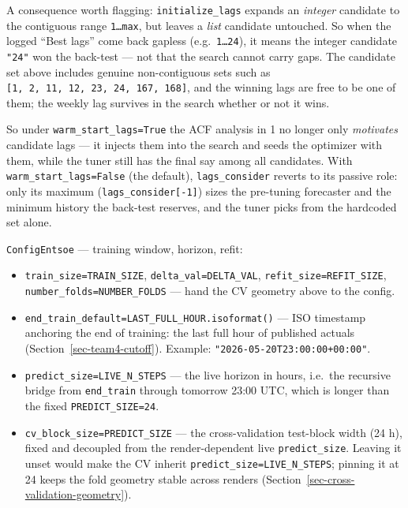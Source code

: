 \documentclass[
  english,
  letterpaper,
]{scrbook}
\providecommand{\tightlist}{%
  \setlength{\itemsep}{0pt}\setlength{\parskip}{0pt}}
\begin{document}
\begin{tcolorbox}
A consequence worth flagging: \texttt{initialize\_lags} expands an
\emph{integer} candidate to the contiguous range \texttt{1…max}, but
leaves a \emph{list} candidate untouched. So when the logged ``Best
lags'' come back gapless (e.g.~\texttt{1…24}), it means the integer
candidate \texttt{"24"} won the back-test --- not that the search cannot
carry gaps. The candidate set above includes genuine non-contiguous sets
such as \texttt{{[}1,\ 2,\ 11,\ 12,\ 23,\ 24,\ 167,\ 168{]}}, and the
winning lags are free to be one of them; the weekly lag survives in the
search whether or not it wins.

So under \texttt{warm\_start\_lags=True} the ACF analysis in 1 no longer
only \emph{motivates} candidate lags --- it injects them into the search
and seeds the optimizer with them, while the tuner still has the final
say among all candidates. With \texttt{warm\_start\_lags=False} (the
default), \texttt{lags\_consider} reverts to its passive role: only its
maximum (\texttt{lags\_consider{[}-1{]}}) sizes the pre-tuning
forecaster and the minimum history the back-test reserves, and the tuner
picks from the hardcoded set alone.

\end{tcolorbox}

\texttt{ConfigEntsoe} --- training window, horizon, refit:

\begin{itemize}
\tightlist
\item
  \texttt{train\_size=TRAIN\_SIZE}, \texttt{delta\_val=DELTA\_VAL},
  \texttt{refit\_size=REFIT\_SIZE}, \texttt{number\_folds=NUMBER\_FOLDS}
  --- hand the CV geometry above to the config.
\item
  \texttt{end\_train\_default=LAST\_FULL\_HOUR.isoformat()} --- ISO
  timestamp anchoring the end of training: the last full hour of
  published actuals (Section~\ref{sec-team4-cutoff}). Example:
  \texttt{"2026-05-20T23:00:00+00:00"}.
\item
  \texttt{predict\_size=LIVE\_N\_STEPS} --- the live horizon in hours,
  i.e.~the recursive bridge from \texttt{end\_train} through tomorrow
  23:00 UTC, which is longer than the fixed \texttt{PREDICT\_SIZE=24}.
\item
  \texttt{cv\_block\_size=PREDICT\_SIZE} --- the cross-validation
  test-block width (24 h), fixed and decoupled from the render-dependent
  live \texttt{predict\_size}. Leaving it unset would make the CV
  inherit \texttt{predict\_size=LIVE\_N\_STEPS}; pinning it at 24 keeps
  the fold geometry stable across renders
  (Section~\ref{sec-cross-validation-geometry}).
\end{itemize}
\end{document}
